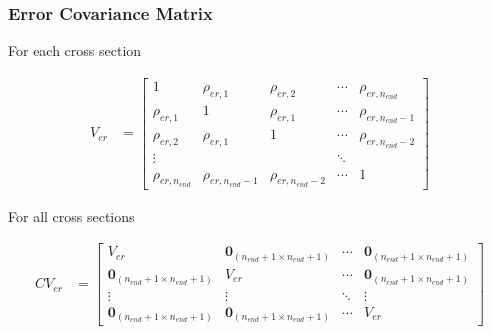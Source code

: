 \documentclass[9pt]{beamer}
\begin{document}
\begin{frame} 
\frametitle{Error Covariance Matrix } 

For each cross section

$$
\begin{align*}
V_{er} &= \begin{bmatrix} 
1 & \rho_{er,1} & \rho_{er,2} & \cdots & \rho_{er,n_{end}} \\[8pt]
\rho_{er,1} & 1  & \rho_{er,1} &\cdots & \rho_{er,n_{end}-1} \\[8pt]
\rho_{er,2} & \rho_{er,1} & 1 & \cdots & \rho_{er,n_{end}-2} \\[8pt]
\vdots & &&\ddots&  \\[8pt]
 \rho_{er,n_{end}} & \rho_{er,n_{end}-1} & \rho_{er,n_{end}-2} & \cdots &  1 
\end{bmatrix}
\end{align*}
$$

For all cross sections

$$
\begin{align*}
CV_{er} &= 
\begin{bmatrix}
V_{er} & \mathbf{0}_{(n_{end}+1 \times n_{end}+1)} & \cdots & \mathbf{0}_{(n_{end}+1 \times n_{end}+1)}  \\[8pt]
\mathbf{0}_{(n_{end}+1 \times n_{end}+1)} & V_{er} & \cdots & \mathbf{0}_{(n_{end}+1 \times n_{end}+1)}  \\[8pt]
\vdots & \vdots & \ddots & \vdots \\[10pt]
\mathbf{0}_{(n_{end}+1 \times n_{end}+1)} & \mathbf{0}_{(n_{end}+1 \times n_{end}+1)} & \cdots & V_{er}
\end{bmatrix} 
\end{align*}
$$

\end{frame}
\end{document}
